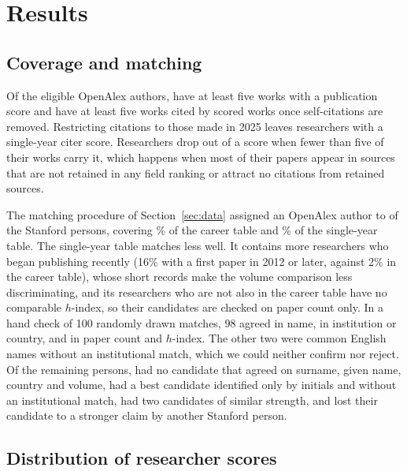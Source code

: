 \section{Results}
\label{sec:results}

\subsection{Coverage and matching}

Of the \NOaEligible{} eligible OpenAlex authors, \NRankedPubvFrac{} have at least five works with a publication score and \NRankedCvFracNs{} have at least five works cited by scored works once self-citations are removed. Restricting citations to those made in 2025 leaves \NRankedCvFracSinglens{} researchers with a single-year citer score. Researchers drop out of a score when fewer than five of their works carry it, which happens when most of their papers appear in sources that are not retained in any field ranking or attract no citations from retained sources.

The matching procedure of Section~\ref{sec:data} assigned an OpenAlex author to \NMatchMatched{} of the \NStPersons{} Stanford persons, covering \NMatchCareerPct{}\% of the career table and \NMatchSinglePct{}\% of the single-year table. The single-year table matches less well. It contains more researchers who began publishing recently (16\% with a first paper in 2012 or later, against 2\% in the career table), whose short records make the volume comparison less discriminating, and its researchers who are not also in the career table have no comparable $h$-index, so their candidates are checked on paper count only. In a hand check of 100 randomly drawn matches, 98 agreed in name, in institution or country, and in paper count and $h$-index. The other two were common English names without an institutional match, which we could neither confirm nor reject. Of the remaining persons, \NMatchUnmatched{} had no candidate that agreed on surname, given name, country and volume, \NMatchImplausible{} had a best candidate identified only by initials and without an institutional match, \NMatchAmbiguous{} had two candidates of similar strength, and \NMatchConflict{} lost their candidate to a stronger claim by another Stanford person.

\subsection{Distribution of researcher scores}

